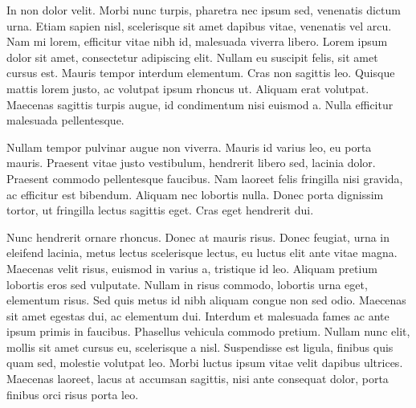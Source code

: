 \documentclass{sigchi}
\begin{document}
In non dolor velit. Morbi nunc turpis, pharetra nec ipsum sed, venenatis dictum urna. Etiam sapien nisl, scelerisque sit amet dapibus vitae, venenatis vel arcu. Nam mi lorem, efficitur vitae nibh id, malesuada viverra libero. Lorem ipsum dolor sit amet, consectetur adipiscing elit. Nullam eu suscipit felis, sit amet cursus est. Mauris tempor interdum elementum. Cras non sagittis leo. Quisque mattis lorem justo, ac volutpat ipsum rhoncus ut. Aliquam erat volutpat. Maecenas sagittis turpis augue, id condimentum nisi euismod a. Nulla efficitur malesuada pellentesque.

Nullam tempor pulvinar augue non viverra. Mauris id varius leo, eu porta mauris. Praesent vitae justo vestibulum, hendrerit libero sed, lacinia dolor. Praesent commodo pellentesque faucibus. Nam laoreet felis fringilla nisi gravida, ac efficitur est bibendum. Aliquam nec lobortis nulla. Donec porta dignissim tortor, ut fringilla lectus sagittis eget. Cras eget hendrerit dui.

Nunc hendrerit ornare rhoncus. Donec at mauris risus. Donec feugiat, urna in eleifend lacinia, metus lectus scelerisque lectus, eu luctus elit ante vitae magna. Maecenas velit risus, euismod in varius a, tristique id leo. Aliquam pretium lobortis eros sed vulputate. Nullam in risus commodo, lobortis urna eget, elementum risus. Sed quis metus id nibh aliquam congue non sed odio. Maecenas sit amet egestas dui, ac elementum dui. Interdum et malesuada fames ac ante ipsum primis in faucibus. Phasellus vehicula commodo pretium. Nullam nunc elit, mollis sit amet cursus eu, scelerisque a nisl. Suspendisse est ligula, finibus quis quam sed, molestie volutpat leo. Morbi luctus ipsum vitae velit dapibus ultrices. Maecenas laoreet, lacus at accumsan sagittis, nisi ante consequat dolor, porta finibus orci risus porta leo.

\cite{microsoft_kinect_namespace}
\cite{microsoft_kinect_coordinates}
\cite{wei_kinect_calibration}
\cite{eggert_four_algorithms}
\cite{horn_unit_quaternions}


%
%
%
%
%
\balance{}



\end{document}
